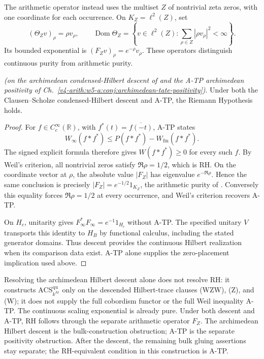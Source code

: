The arithmetic operator instead uses the multiset \(Z\) of nontrivial
zeta zeros, with one coordinate for each occurrence. On \(K_Z=\ell^2(Z)\), set
\[
 (\Theta_Z v)_\rho=\rho v_\rho,\qquad
 \operatorname{Dom}\Theta_Z=
 \left\{v\in\ell^2(Z):\sum_{\rho\in Z}|\rho v_\rho|^2<\infty\right\}.
\]
Its bounded exponential is \((F_Zv)_\rho=e^{-\rho}v_\rho\).
These operators distinguish continuous purity from arithmetic purity.

\begin{theorem}
\label{v4-arith:w10-a:thm:descent-plus-ATP-equals-RH}
\ClaimStatusProvedHereConditional \emph{(on the archimedean
condensed-Hilbert descent of
 and the
A-TP archimedean positivity of
Ch.~\ref{v4-arith:w5-a:conj:archimedean-tate-positivity})}. Under
both the Clausen--Scholze condensed-Hilbert descent and A-TP, the Riemann
Hypothesis holds.
\end{theorem}

\begin{proof}
For \(f\in C_c^\infty(\mathbb R)\), with
\(f^*(t)=\overline{f(-t)}\), A-TP states
\[
 W_\infty(f*f^*)\le P(f*f^*)-W_{\mathrm{fin}}(f*f^*).
\]
The signed explicit formula therefore gives \(W(f*f^*)\ge0\) for
every such \(f\). By Weil's criterion, all nontrivial zeros satisfy
\(\Re\rho=1/2\), which is RH.
On the coordinate vector at \(\rho\), the absolute value \(|F_Z|\)
has eigenvalue \(e^{-\Re\rho}\). Hence the same conclusion is precisely
\( |F_Z|=e^{-1/2}1_{K_Z}\), the arithmetic purity of
.
Conversely this equality forces \(\Re\rho=1/2\) at every occurrence,
and Weil's criterion recovers A-TP.

On \(H_c\), unitarity gives
\(F_\infty^*F_\infty=e^{-1}1_{H_c}\) without A-TP.
The specified unitary \(V\) transports this identity to \(H_B\)
by functional calculus, including the stated generator domains.
Thus descent provides the continuous Hilbert realization when its
comparison data exist. A-TP alone supplies the zero-placement
implication used above.
\end{proof}

\begin{remark}
\label{v4-arith:w10-a:rem:what-resolves}
Resolving the archimedean Hilbert descent alone does not
resolve RH: it constructs
\(\mathrm{ACS}^{\mathrm{qu}}_{k^{\mathrm{Ar}}}\) only on the
descended Hilbert-trace clauses (WZW), (Z), and (W); it does not
supply the full cobordism functor or the full Weil inequality A-TP.
The continuous scaling exponential is already pure. Under both descent
and A-TP, RH follows through the separate arithmetic operator \(F_Z\).
The archimedean Hilbert descent is the bulk-construction
obstruction; A-TP is the separate positivity obstruction. After the
descent, the remaining bulk gluing assertions stay separate; the
RH-equivalent condition in this construction is A-TP.
\end{remark}

